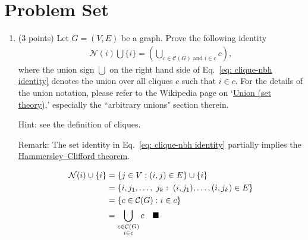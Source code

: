 \documentclass[11pt,letterpaper, leqno]{article}
\numberwithin{equation}{section}
\numberwithin{theorem}{section}
\numberwithin{lemma}{section}
\numberwithin{corollary}{section}
\numberwithin{definition}{section}
\numberwithin{proposition}{section}
\numberwithin{remark}{section}
\numberwithin{example}{section}
\renewcommand{\qed}{\quad \blacksquare}
\begin{document}
\newpage

\section{Problem Set}

\begin{enumerate}

\item (3 points) Let $G=(V,E)$ be a graph. Prove the following identity
\begin{align}\label{eq: clique-nbh identity}
    \mathcal{N}(i)\bigcup\{i\}=\left(\bigcup_{c\in\mathcal{C}(G) \mbox{ and }i\in c} c\right),
\end{align}
where the union sign $\bigcup$ on the right hand side of Eq.~\eqref{eq: clique-nbh identity} denotes the union over all cliques $c$ such that $i\in c$. For the details of the union notation, please refer to the Wikipedia page on `\href{https://en.wikipedia.org/wiki/Union_(set_theory)}{Union (set theory)},' especially the ``arbitrary unions" section therein.

Hint: see the definition of cliques.

Remark: The set identity in Eq.~\eqref{eq: clique-nbh identity} partially implies the \href{https://en.wikipedia.org/wiki/Hammersley-Clifford_theorem}{Hammersley–Clifford theorem}.

    \color{blue}
        \begin{align*}
            \mathcal{N}(i) \cup \{i\} &= \{j \in V: (i, j) \in E\} \cup \{i\}\\
                &= \{i, j_1, \dots,\; j_k:\; (i, j_1), \dots, (i, j_k) \in E\}\\
                &= \{c \in \mathcal{C}(G): i \in c\}\\
                &= \bigcup_{\begin{subarray}{c}
                    c \in \mathcal{C}(G)\\
                    i \in c
                \end{subarray}} c\qed
        \end{align*}
    \color{black}
\pagebreak


\end{enumerate}
\end{document}

